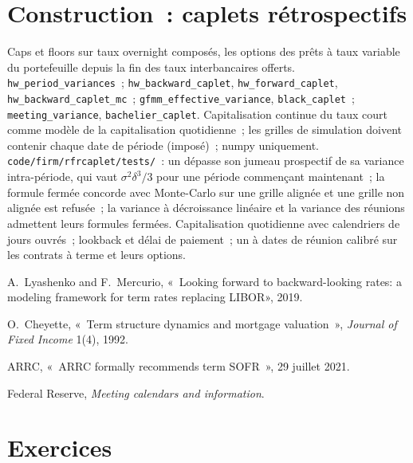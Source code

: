 \section{Construction~: caplets rétrospectifs}\label{bld:rc:modelling-overnight-rate-products:rfrcaplet}

\begin{build}
 Caps et floors sur taux overnight composés, les options des
prêts à taux variable du portefeuille depuis la fin des taux interbancaires offerts.
 \texttt{hw\_period\_variances}~; \texttt{hw\_backward\_caplet},
\texttt{hw\_forward\_caplet}, \texttt{hw\_backward\_caplet\_mc}~;
\texttt{gfmm\_effective\_variance}, \texttt{black\_caplet}~;
\texttt{meeting\_variance}, \texttt{bachelier\_caplet}.
 Capitalisation continue du taux court comme modèle de la
capitalisation quotidienne~; les grilles de simulation doivent contenir chaque date de période (imposé)~; numpy uniquement.
 \texttt{code/firm/rfrcaplet/tests/}~: un 
dépasse son jumeau prospectif de sa variance intra-période, qui vaut
$\sigma^2\delta^3/3$ pour une période commençant maintenant~; la formule fermée concorde avec Monte-Carlo
sur une grille alignée et une grille non alignée est refusée~; la variance à décroissance linéaire et la
variance des réunions admettent leurs formules fermées.
 Capitalisation quotidienne avec calendriers de jours ouvrés~; lookback et
délai de paiement~; un  à dates de réunion calibré sur les contrats à terme et leurs options.
\end{build}

\begin{omsources}
\item A.\ Lyashenko and F.\ Mercurio, «~Looking forward to backward-looking rates:
a modeling framework for term rates replacing LIBOR», 2019.
\item O.\ Cheyette, «~Term structure dynamics and mortgage valuation~», \emph{Journal
of Fixed Income} 1(4), 1992.
\item ARRC, «~ARRC formally recommends term SOFR~», 29 juillet 2021.
\item Federal Reserve, \emph{Meeting calendars and information}.
\end{omsources}

\section{Exercices}

